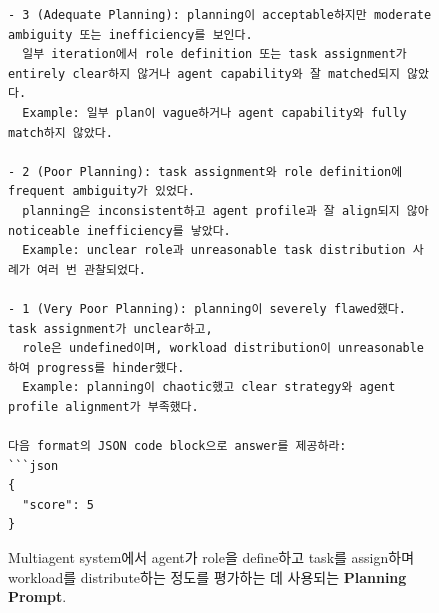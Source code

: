 \begin{figure}[htbp]
\begin{tcolorbox}
\begin{verbatim}
- 3 (Adequate Planning): planning이 acceptable하지만 moderate ambiguity 또는 inefficiency를 보인다.
  일부 iteration에서 role definition 또는 task assignment가 entirely clear하지 않거나 agent capability와 잘 matched되지 않았다.
  Example: 일부 plan이 vague하거나 agent capability와 fully match하지 않았다.

- 2 (Poor Planning): task assignment와 role definition에 frequent ambiguity가 있었다.
  planning은 inconsistent하고 agent profile과 잘 align되지 않아 noticeable inefficiency를 낳았다.
  Example: unclear role과 unreasonable task distribution 사례가 여러 번 관찰되었다.

- 1 (Very Poor Planning): planning이 severely flawed했다. task assignment가 unclear하고,
  role은 undefined이며, workload distribution이 unreasonable하여 progress를 hinder했다.
  Example: planning이 chaotic했고 clear strategy와 agent profile alignment가 부족했다.

다음 format의 JSON code block으로 answer를 제공하라:
```json
{
  "score": 5
}
\end{verbatim}
\end{tcolorbox}

\caption{Multiagent system에서 agent가 role을 define하고 task를 assign하며 workload를 distribute하는 정도를 평가하는 데 사용되는 \textbf{Planning Prompt}.}
\label{fig:planning_prompt}
\end{figure}


